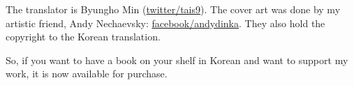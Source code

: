 The translator is Byungho Min (\href{http://go.yurichev.com/17344}{twitter/tais9}).
The cover art was done by my artistic friend, Andy Nechaevsky:
\href{http://go.yurichev.com/17023}{facebook/andydinka}.
They also hold the copyright to the Korean translation.

So, if you want to have a  book on your shelf in Korean and 
want to support my work, it is now available for purchase.

